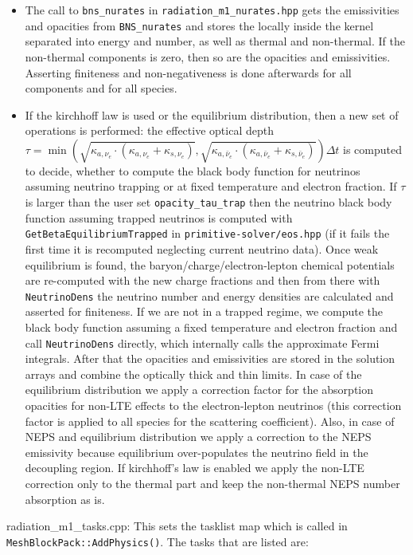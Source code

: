 \documentclass{article}
\newcommand{\var}[1]{%
  {\setlength{\fboxsep}{1.5pt}%
   \colorbox{varbg}{\textcolor{varfg}{\texttt{\small #1}}}}}
\begin{document}
\begin{itemize}
  \item The call to \var{bns\_nurates} in \var{radiation\_m1\_nurates.hpp} gets the emissivities and opacities from \texttt{BNS\_nurates} and stores the locally inside the kernel separated into energy and number, as well as
  thermal and non-thermal. If the non-thermal components is zero, then so are the opacities and emissivities. Asserting finiteness and non-negativeness is done afterwards for all components and for all species.
  \item If the kirchhoff law is used or the equilibrium distribution, then a new set of operations is performed: the effective optical depth $\tau=\min{\left(\sqrt{\kappa_{a,\nu_e}\cdot(\kappa_{a,\nu_e}+\kappa_{s,\nu_e})},\sqrt{\kappa_{a,\bar{\nu}_e}\cdot(\kappa_{a,\bar{\nu}_e}+\kappa_{s,\bar{\nu}_e})}\right)}\Delta t$
  is computed to decide, whether to compute the black body function for neutrinos assuming neutrino trapping or at fixed temperature and electron fraction. If $\tau$ is larger than the user set \var{opacity\_tau\_trap} then
  the neutrino black body function assuming trapped neutrinos is computed with \var{GetBetaEquilibriumTrapped} in \var{primitive-solver/eos.hpp} (if it fails the first time it is recomputed neglecting
  current neutrino data). Once weak equilibrium is found, the baryon/charge/electron-lepton chemical potentials are re-computed with the new charge fractions and then from there
  with \var{NeutrinoDens} the neutrino number and energy densities are calculated and asserted for finiteness. If we are not in a trapped regime, we compute the black body function assuming a fixed temperature and
  electron fraction and call \var{NeutrinoDens} directly, which internally calls the approximate Fermi integrals. After that the opacities and emissivities are stored in the solution arrays and combine the optically thick and
  thin limits. In case of the equilibrium distribution we apply a correction factor for the absorption opacities for non-LTE effects to the electron-lepton neutrinos (this correction factor is applied to all species for the scattering coefficient).
  Also, in case of NEPS and equilibrium distribution we apply a correction to the NEPS emissivity because equilibrium over-populates the neutrino field in the decoupling region. If kirchhoff's law is enabled we apply the non-LTE correction
  only to the thermal part and keep the non-thermal NEPS number absorption as is.
\end{itemize}
{\color{gray}radiation\_m1\_tasks.cpp:} This sets the tasklist map which is called in \var{MeshBlockPack::AddPhysics()}. The tasks that are listed are:
\end{document}
